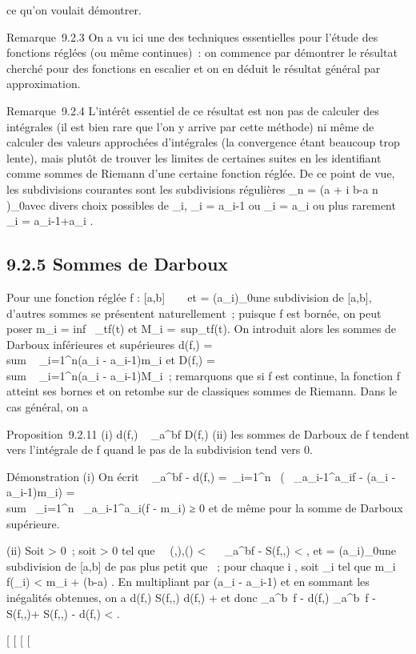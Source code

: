 \documentclass[]{article}
\begin{document}
ce qu'on voulait démontrer.

Remarque~9.2.3 On a vu ici une des techniques essentielles pour l'étude
des fonctions réglées (ou même continues)~: on commence par démontrer le
résultat cherché pour des fonctions en escalier et on en déduit le
résultat général par approximation.

Remarque~9.2.4 L'intérêt essentiel de ce résultat est non pas de
calculer des intégrales (il est bien rare que l'on y arrive par cette
méthode) ni même de calculer des valeurs approchées d'intégrales (la
convergence étant beaucoup trop lente), mais plutôt de trouver les
limites de certaines suites en les identifiant comme sommes de Riemann
d'une certaine fonction réglée. De ce point de vue, les subdivisions
courantes sont les subdivisions régulières \sigma_n = (a + i b-a
\over n )_0\leqi\leqn avec divers choix possibles de
\xi_i, \xi_i = a_i-1 ou \xi_i =
a_i ou plus rarement \xi_i =
a_i-1+a_i  .

\subsection{9.2.5 Sommes de Darboux}

Pour une fonction réglée f : [a,b] \rightarrow~ ~ et \sigma =
(a_i)_0\leqi\leqn une subdivision de [a,b], d'autres
sommes se présentent naturellement~; puisque f est bornée, on peut poser
m_i = inf~
_t\in[a_i-1,a_i]f(t) et M_i
=\
sup_t\in[a_i-1,a_i]f(t). On introduit alors
les sommes de Darboux inférieures et supérieures d(f,\sigma)
= \\sum ~
_i=1^n(a_i - a_i-1)m_i et
D(f,\sigma) = \\sum ~
_i=1^n(a_i - a_i-1)M_i~;
remarquons que si f est continue, la fonction f atteint ses bornes et on
retombe sur de classiques sommes de Riemann. Dans le cas général, on a

Proposition~9.2.11 (i) d(f,\sigma) \leq\int ~
_a^bf \leq D(f,\sigma) (ii) les sommes de Darboux de f tendent
vers l'intégrale de f quand le pas de la subdivision tend vers 0.

Démonstration (i) On écrit \int ~
_a^bf - d(f,\sigma) =\
\sum  _i=1^n~\left
(\int ~
_a_i-1^a_if - (a_i -
a_i-1)m_i\right )
= \\sum~
_i=1^n\int ~
_a_i-1^a_i(f - m_i) ≥ 0 et de
même pour la somme de Darboux supérieure.

(ii) Soit \epsilon > 0~; soit \eta > 0 tel que
\forall~~(\sigma,\xi),\quad \delta(\sigma) < \eta
\rigtharrow~\left \int ~
_a^bf - S(f,\sigma,\xi)\right 
< \epsilon {} , et \sigma =
(a_i)_0\leqi\leqn une subdivision de [a,b] de pas plus
petit que \eta~; pour chaque i \in [1,n], soit \xi_i \in
[a_i-1,a_i] tel que m_i \leq f(\xi_i)
< m_i + \epsilon {}(b-a) . En
multipliant par (a_i - a_i-1) et en sommant les
inégalités obtenues, on a d(f,\sigma) \leq S(f,\sigma,\xi) \leq d(f,\sigma) + \epsilon
\over 2 et donc \left
\int  _a^b~f -
d(f,\sigma)\right \leq\left
\int  _a^b~f -
S(f,\sigma,\xi)\right  + S(f,\sigma,\xi) -
d(f,\sigma) < \epsilon.

[
[
[
[
\end{document}
